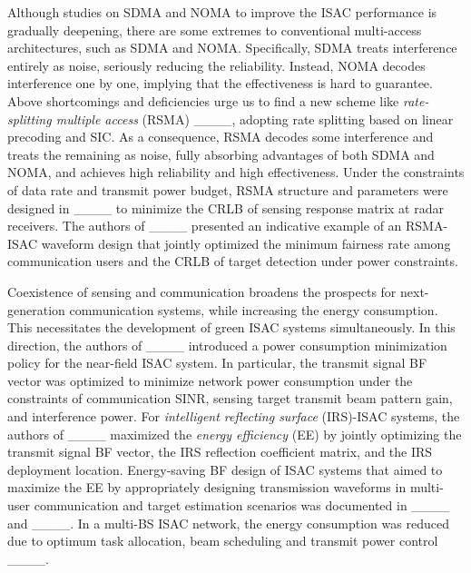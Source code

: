 Although studies on SDMA and NOMA to improve the ISAC performance is gradually deepening, there are some extremes to conventional multi-access architectures, such as SDMA and NOMA. Specifically, SDMA treats interference entirely as noise, seriously reducing the reliability. Instead, NOMA decodes interference one by one, implying that the effectiveness is hard to guarantee. Above shortcomings and deficiencies urge us to find a new scheme like \emph{rate-splitting multiple access} (RSMA)  ____, adopting rate splitting based on linear precoding and SIC. As a consequence, RSMA decodes some interference and treats the remaining as noise, fully absorbing advantages of both SDMA and NOMA, and achieves high reliability and high effectiveness. Under the constraints of data rate and transmit power budget, RSMA structure and parameters were designed in ____ to minimize the CRLB of sensing response matrix at radar receivers. The authors of ____ presented an indicative example of an RSMA-ISAC waveform design that jointly optimized the minimum fairness rate among communication users and the CRLB of target detection under power constraints.

Coexistence of sensing and communication broadens the prospects for next-generation communication systems, while increasing the energy consumption. This necessitates the development of green ISAC systems simultaneously. In this direction, the authors of ____ introduced a power consumption minimization policy for the near-field ISAC system. In particular, the transmit signal BF vector was optimized to minimize network power consumption under the constraints of communication SINR, sensing target transmit beam pattern gain, and interference power. For \emph{intelligent reflecting surface} (IRS)-ISAC systems, the authors of ____ maximized the \emph{energy efficiency} (EE) by jointly optimizing the transmit signal BF vector, the IRS reflection coefficient matrix, and the IRS deployment location. Energy-saving BF design of ISAC systems that aimed to maximize the EE by appropriately designing transmission waveforms in multi-user communication and target estimation scenarios was documented in ____ and ____. %
In a multi-BS ISAC network, the energy consumption was reduced due to optimum task allocation, beam scheduling and transmit power control ____. %

